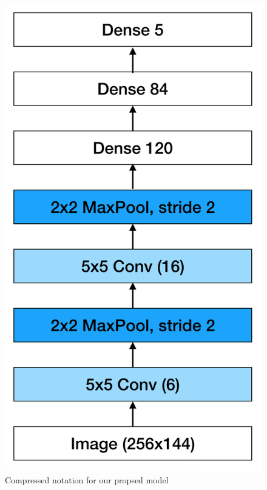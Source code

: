 \begin{figure}[H]
  \centering
  \includegraphics[scale=0.60]{images/Chapter4/proposed_model.png}
  \caption{Compressed notation for our propsed model}
  \label{fig:remote_ssh}
\end{figure}
